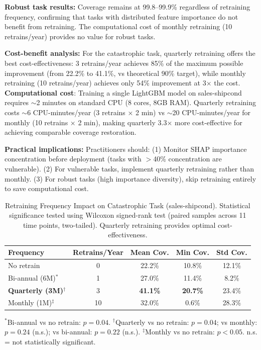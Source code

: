 \documentclass[sigconf]{acmart}
\begin{document}
\textbf{Robust task results:} Coverage remains at 99.8--99.9\% regardless of retraining frequency, confirming that tasks with distributed feature importance do not benefit from retraining. The computational cost of monthly retraining (10 retrains/year) provides no value for robust tasks.

\textbf{Cost-benefit analysis:} For the catastrophic task, quarterly retraining offers the best cost-effectiveness: 3 retrains/year achieves 85\% of the maximum possible improvement (from 22.2\% to 41.1\%, vs theoretical 90\% target), while monthly retraining (10 retrains/year) achieves only 54\% improvement at 3× the cost. \textbf{Computational cost}: Training a single LightGBM model on sales-shipcond requires $\sim$2 minutes on standard CPU (8 cores, 8GB RAM). Quarterly retraining costs $\sim$6 CPU-minutes/year (3 retrains × 2 min) vs $\sim$20 CPU-minutes/year for monthly (10 retrains × 2 min), making quarterly 3.3× more cost-effective for achieving comparable coverage restoration.

\textbf{Practical implications:} Practitioners should: (1) Monitor SHAP importance concentration before deployment (tasks with $>$40\% concentration are vulnerable). (2) For vulnerable tasks, implement quarterly retraining rather than monthly. (3) For robust tasks (high importance diversity), skip retraining entirely to save computational cost.

\begin{table}[h]
\centering
\caption{Retraining Frequency Impact on Catastrophic Task (sales-shipcond).
Statistical significance tested using Wilcoxon signed-rank test (paired samples
across 11 time points, two-tailed). Quarterly retraining provides optimal cost-effectiveness.}
\label{tab:retrain}
\begin{tabular}{lcccc}
\toprule
Frequency & Retrains/Year & Mean Cov. & Min Cov. & Std Cov. \\
\midrule
No retrain                &  0 &   22.2\% &   10.8\% & 12.1\% \\
Bi-annual (6M)$^{*}$      &  1 &   27.0\% &   11.4\% &  8.2\% \\
\textbf{Quarterly (3M)}$^{\dagger}$ &  3 & \textbf{41.1\%} & \textbf{20.7\%} & 23.4\% \\
Monthly (1M)$^{\ddagger}$ & 10 &   32.0\% &    0.6\% & 28.3\% \\
\bottomrule
\end{tabular}
\vspace{2mm}

\raggedright
\footnotesize
$^{*}$Bi-annual vs no retrain: $p=0.04$. $^{\dagger}$Quarterly vs no retrain: $p=0.04$; vs monthly: $p=0.24$ (n.s.); vs bi-annual: $p=0.22$ (n.s.). $^{\ddagger}$Monthly vs no retrain: $p<0.05$. n.s. = not statistically significant.
\end{table}
\end{document}
